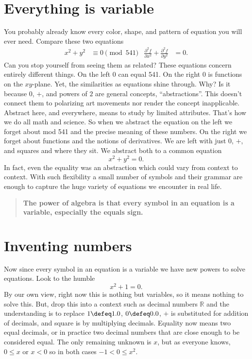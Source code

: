 \section{Everything is variable}
You probably already know every color, shape, and pattern of 
equation you will ever need.  Compare these two equations
\begin{align*}
    x^2+y^2 & \equiv 0 \pmod{541} 
    & 
    \frac{\partial^2 f}{\partial x^2}+\frac{\partial^2 f}{\partial y^2} & =0.
\end{align*}
Can you stop yourself from seeing them as related?
These equations concern entirely different things.  On the left $0$ can 
equal 541.  On the right $0$ is functions on the $xy$-plane.
Yet, the similarities as equations shine through.  Why? Is it because $0$, 
$+$, and  powers of $2$ are general concepts, ``abstractions''.  This doesn't connect them to
polarizing art movements nor render the concept inapplicable.  Abstract here,
and everywhere, means to study by limited attributes.  That's how we do all
math and science.  So when we abstract the equation on the left we forget
about mod 541 and the precise meaning of these numbers.  On the right we forget
about functions and the notions of derivatives.  We are left with just $0$, 
$+$, and squares and where they sit.  We abstract both to a common equation
\[
    x^2+y^2=0.
\]
In fact, even the equality was an abstraction which could vary from context to context.
With such flexibility a small number of symbols and their grammar are enough to capture 
the huge variety of equations we encounter in real life.

\begin{quote}
    \textbf{The power of algebra is that every symbol 
    in an equation is a variable, especially the equals sign.}
\end{quote}

\section{Inventing numbers}
Now since every symbol in an equation is a variable we have new powers 
to solve equations.  Look to the humble 
\[
    x^2+1=0.
\]
By our own view, right now this is nothing but variables, so it means nothing to
solve this.  But, drop this into a context such as decimal numbers $\mathbb{R}$
and the understanding is to replace $1\defeq 1.0$, $0\defeq 0.0$, $+$ is
substituted for addition of decimals, and square is by multiplying decimals.
Equality now means two equal decimals, or in practice two decimal numbers that are close enough 
to be considered equal.  The only remaining unknown is $x$, but as everyone 
knows, $0\leq x$ or $x<0$ so in both cases $-1<0\leq x^2$.


